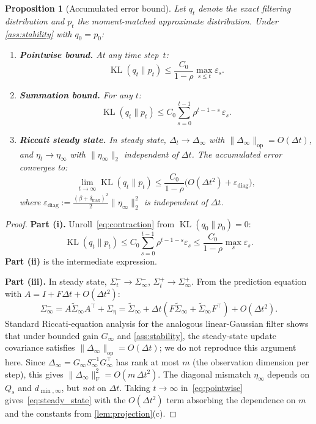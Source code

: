 \documentclass{article}
\theoremstyle{plain}
\newtheorem{proposition}[theorem]{Proposition}
\theoremstyle{definition}
\theoremstyle{remark}
\DeclareMathOperator{\KL}{KL}
\newcommand{\norm}[1]{\lVert #1 \rVert}
\newcommand{\fnorm}[1]{\lVert #1 \rVert_{\mathrm{F}}}
\newcommand{\opnorm}[1]{\lVert #1 \rVert_{\mathrm{op}}}
\begin{document}
\begin{proposition}[Accumulated error bound]
\label{prop:accumulated}
Let $q_t$ denote the exact filtering distribution and $p_t$ the moment-matched approximate distribution. Under \cref{ass:stability} with $q_0 = p_0$:
\begin{enumerate}
\item[\textup{(i)}] \textbf{Pointwise bound.} At any time step~$t$:
\begin{equation}\label{eq:pointwise}
\KL(q_t \| p_t) \leq \frac{C_0}{1 - \rho}\max_{s \leq t} \varepsilon_s.
\end{equation}
\item[\textup{(ii)}] \textbf{Summation bound.} For any $t$:
\begin{equation}\label{eq:summation}
\KL(q_t \| p_t) \leq C_0 \sum_{s=0}^{t-1} \rho^{t-1-s}\,\varepsilon_s.
\end{equation}
\item[\textup{(iii)}] \textbf{Riccati steady state.} In steady state, $\Delta_t \to \Delta_\infty$ with $\opnorm{\Delta_\infty} = O(\Delta t)$, and $\eta_t \to \eta_\infty$ with $\norm{\eta_\infty}_2$ independent of $\Delta t$. The accumulated error converges to:
\begin{equation}\label{eq:steady_state}
\lim_{t\to\infty}\KL(q_t\|p_t) \leq \frac{C_0}{1-\rho}\bigl(O(\Delta t^2) + \varepsilon_{\mathrm{diag}}\bigr),
\end{equation}
where $\varepsilon_{\mathrm{diag}} := \tfrac{(\beta+\delta_{\max})^2}{2}\norm{\eta_\infty}_2^2$ is independent of $\Delta t$.
\end{enumerate}
\end{proposition}

\begin{proof}
\textbf{Part (i).} Unroll~\eqref{eq:contraction} from $\KL(q_0\|p_0) = 0$:
\[
\KL(q_t\|p_t) \leq C_0\sum_{s=0}^{t-1}\rho^{t-1-s}\varepsilon_s \leq \frac{C_0}{1-\rho}\max_s \varepsilon_s.
\]
\textbf{Part (ii)} is the intermediate expression.

\medskip\noindent\textbf{Part (iii).} In steady state, $\Sigma_t^- \to \Sigma_\infty^-$, $\Sigma_t^+ \to \Sigma_\infty^+$. From the prediction equation with $A = I + F\Delta t + O(\Delta t^2)$:
\[
\Sigma_\infty^- = A\widetilde{\Sigma}_\infty A^\top + \Sigma_\eta = \widetilde{\Sigma}_\infty + \Delta t(F\widetilde{\Sigma}_\infty + \widetilde{\Sigma}_\infty F^\top) + O(\Delta t^2).
\]
Standard Riccati-equation analysis for the analogous linear-Gaussian filter shows that under bounded gain $G_\infty$ and \cref{ass:stability}, the steady-state update covariance satisfies $\opnorm{\Delta_\infty} = O(\Delta t)$; we do not reproduce this argument here. Since $\Delta_\infty = G_\infty S_\infty^{-1} G_\infty^\top$ has rank at most $m$ (the observation dimension per step), this gives $\fnorm{\Delta_\infty}^2 = O(m\,\Delta t^2)$. The diagonal mismatch $\eta_\infty$ depends on $Q_s$ and $d_{\min,\infty}$, but \emph{not} on $\Delta t$. Taking $t \to \infty$ in~\eqref{eq:pointwise} gives~\eqref{eq:steady_state} with the $O(\Delta t^2)$ term absorbing the dependence on $m$ and the constants from \cref{lem:projection}(c).
\end{proof}
\end{document}
